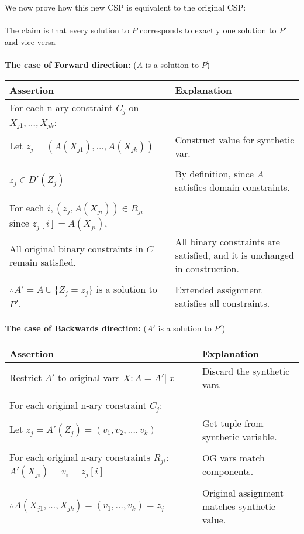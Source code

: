 \documentclass[11pt]{article}
\newenvironment{answercols}
  {\begin{center}\begin{tabular}{p{0.45\textwidth}p{0.45\textwidth}}
   \toprule
   \textbf{Assertion} & \textbf{Explanation} \\
   \midrule}
  {\\ \bottomrule\end{tabular}\end{center}}
\begin{document}
    \newpage

    \noindent We now prove how this new CSP is equivalent to the original CSP: \\
    \\
    The claim is that every solution to $P$ corresponds to exactly one solution to $P'$ and vice versa\\
    \\
    \textbf{The case of Forward direction:} ($A$ is a solution to $P$)

    \begin{answercols}
        For each n-ary constraint $C_j$ on $X_{j1}, \ldots, X_{jk}$: \\
        Let $z_j = (A(X_{j1}), \ldots, A(X_{jk}))$ &
        Construct value for synthetic var. \\
        \\
        $z_j \in D'(Z_j)$ &
        By definition, since $A$ satisfies domain constraints. \\
        \\
        For each $i, (z_j, A(X_{ji})) \in R_{ji}$ since $z_{j}[i] = A(X_{ji})$, \\
        All original binary constraints in $C$ remain satisfied. &
        All binary constraints are satisfied, and it is unchanged in construction. \\
        \\
        $\therefore A' = A \cup \{Z_j = z_j\}$ is a solution to $P'$. &
        Extended assignment satisfies all constraints.
    \end{answercols}

    \textbf{The case of Backwards direction:} ($A'$ is a solution to $P'$)

    \begin{answercols}
        Restrict $A'$ to original vars $X: A = A'||x$ &
        Discard the synthetic vars. \\
        \\
        For each original n-ary constraint $C_j$: \\
        Let $z_j = A'(Z_j) = (v_1, v_2, \ldots, v_k)$ &
        Get tuple from synthetic variable.\\
        \\
        For each original n-ary constraints $R_{ji}$: $A'(X_{ji}) = v_i = z_{j}[i]$ &
        OG vars match components. \\
        \\
        $\therefore A(X_{j1}, \ldots, X_{jk}) = (v_1, \ldots, v_k) = z_j$ &
        Original assignment matches synthetic value.
    \end{answercols}
\end{document}
